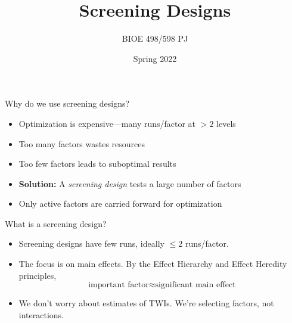 \documentclass[
  10pt,
  ignorenonframetext,
]{beamer}
\title{Screening Designs}
\author{BIOE 498/598 PJ}
\date{Spring 2022}
\providecommand{\tightlist}{%
  \setlength{\itemsep}{0pt}\setlength{\parskip}{0pt}}
\begin{document}
\frame{\titlepage}

\begin{frame}{Why do we use screening designs?}
\protect\hypertarget{why-do-we-use-screening-designs}{}
\newcommand\lo{\ensuremath{\boldsymbol{-}}}
\newcommand\hi{\ensuremath{\boldsymbol{+}}}
\newcommand\iii{\ensuremath{\mathrm{III}}}
\newcommand\iv{\ensuremath{\mathrm{IV}}}
\newcommand\vv{\ensuremath{\mathrm{V}}}

\begin{itemize}
\tightlist
\item
  Optimization is expensive---many runs/factor at \(>2\) levels
\item
  Too many factors wastes resources
\item
  Too few factors leads to suboptimal results
\end{itemize}

\pause

\begin{itemize}
\tightlist
\item
  \textbf{Solution:} A \emph{screening design} tests a large number of
  factors
\item
  Only active factors are carried forward for optimization
\end{itemize}
\end{frame}

\begin{frame}{What is a screening design?}
\protect\hypertarget{what-is-a-screening-design}{}
\begin{itemize}
\tightlist
\item
  Screening designs have few runs, ideally \(\le 2\) runs/factor. \pause
\item
  The focus is on main effects. By the Effect Hierarchy and Effect
  Heredity principles,
  \[ \text{important factor} \approx \text{significant main effect} \]
\end{itemize}

\pause

\begin{itemize}
\tightlist
\item
  We don't worry about estimates of TWIs. We're selecting factors, not
  interactions.
\end{itemize}
\end{frame}
\end{document}
